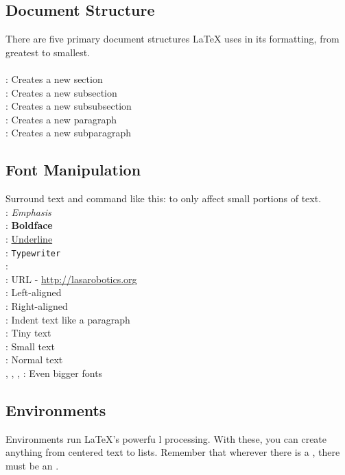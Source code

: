 \subsection{Document Structure}
There are five primary document structures LaTeX uses in its formatting, from greatest to smallest.\\\\
: Creates a new section\\
: Creates a new subsection\\
: Creates a new subsubsection\\
: Creates a new paragraph\\
: Creates a new subparagraph
\subsection{Font Manipulation}
Surround text and command like this:  to only affect small portions of text.\\
: \emph{Emphasis}\\
: \textbf{Boldface}\\
: \underline{Underline}\\
: \texttt{Typewriter}\\
: \\
: URL - \url{http://lasarobotics.org}\\
: Left-aligned\\
: Right-aligned\\
: Indent text like a paragraph\\
: {\tiny Tiny text}\\
: {\small Small text}\\
: {\normalsize Normal text}\\
, , , : Even bigger fonts

\subsection{Environments}
Environments run \LaTeX{}'s powerfu
l processing.  With these, you can create anything from centered text to lists.  Remember that wherever there is a , there must be an .
